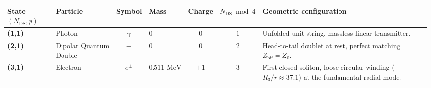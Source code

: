 \documentclass[11pt,a4paper]{article}
\theoremstyle{plain}
\theoremstyle{remark}
\newcommand{\Ncd}{\ensuremath{N_{\mathrm{DS}}}}
\begin{document}
{\small
\renewcommand{\arraystretch}{1.2}
\begin{longtable}{p{1.5cm} p{1.9cm} c p{1.6cm} c c >{\raggedright\arraybackslash}p{4.0cm}}
\toprule
\textbf{State $(\Ncd,p)$} & \textbf{Particle} & \textbf{Symbol} & \textbf{Mass} & \textbf{Charge} & \textbf{$\Ncd \bmod 4$} & \textbf{Geometric configuration} \\
\midrule
\endhead
\bottomrule
\endfoot

\textbf{(1,1)} & Photon & $\gamma$ & $0$ & $0$ & $1$ & Unfolded unit string, massless linear transmitter. \\
\textbf{(2,1)} & Dipolar Quantum Double & $-$ & $0$ & $0$ & $2$ & Head-to-tail doublet at rest, perfect matching $Z_{\text{bif}} = Z_0$. \\
\textbf{(3,1)} & Electron & $e^\pm$ & $0.511\text{ MeV}$ & $\pm 1$ & $3$ & First closed soliton, loose circular winding ($R_3/r \approx 37.1$) at the fundamental radial mode. \\
\end{longtable}}

\newpage
\end{document}

